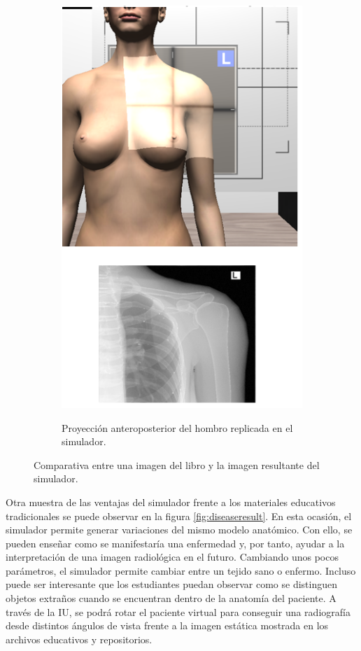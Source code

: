 \begin{figure}[ht]
\begin{subfigure}[b]{0.45\linewidth}
        {\includegraphics[width=\linewidth]{IMG/XRayshoulder3.png}}
        \caption{Proyección anteroposterior del hombro replicada en el simulador.}
    \end{subfigure}
    \caption{\label{fig:xraycomp} Comparativa entre una imagen del libro \cite{carver2012medical} y la imagen resultante del simulador.}
   \end{figure}

Otra muestra de las ventajas del simulador frente a los materiales educativos tradicionales se puede observar en la figura \ref{fig:diseaseresult}. En esta ocasión, el simulador permite generar variaciones del mismo modelo anatómico. Con ello, se pueden enseñar como se manifestaría una enfermedad y, por tanto, ayudar a la interpretación de una imagen radiológica en el futuro. Cambiando unos pocos parámetros, el simulador permite cambiar entre un tejido sano o enfermo. Incluso puede ser interesante que los estudiantes puedan observar como se distinguen objetos extraños cuando se encuentran dentro de la anatomía del paciente. A través de la \ac{IU}, se podrá rotar el paciente virtual para conseguir una radiografía desde distintos ángulos de vista frente a la imagen estática mostrada en los archivos educativos y repositorios.

